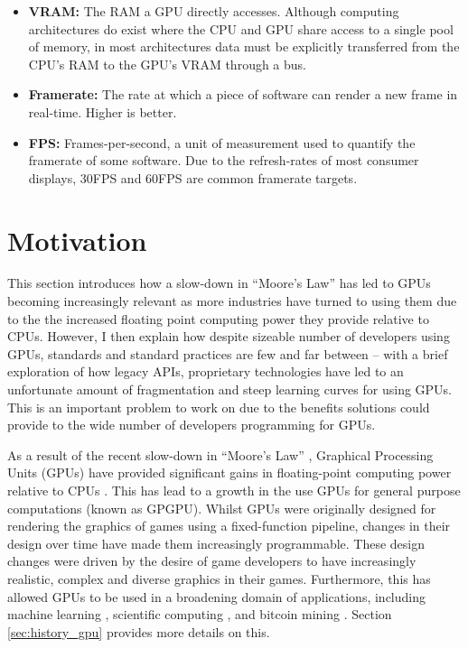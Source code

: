 \documentclass[a4paper,12pt,twoside,openright]{report}
\begin{document}
\begin{itemize}
    \item \textbf{VRAM:} The RAM a GPU directly accesses. Although computing
    architectures do exist where the CPU and GPU share access to a single pool
    of memory, in most architectures data must be explicitly transferred from
    the CPU's RAM to the GPU's VRAM through a bus.

    \item \textbf{Framerate:} The rate at which a piece of software can render
    a new frame in real-time. Higher is better.

    \item \textbf{FPS:} Frames-per-second, a unit of measurement used to
    quantify the framerate of some software. Due to the refresh-rates of most
    consumer displays, 30FPS and 60FPS are common framerate targets.

\end{itemize}

\section{Motivation}

This section introduces how a slow-down in ``Moore's Law'' has led to GPUs
becoming increasingly relevant as more industries have turned to using them due
to the the increased floating point computing power they provide relative to
CPUs. However, I then explain how despite sizeable number of developers using
GPUs, standards and standard practices are few and far between -- with a brief
exploration of how legacy APIs, proprietary technologies have led to an
unfortunate amount of fragmentation and steep learning curves for using GPUs.
This is an important problem to work on due to the benefits solutions could
provide to the wide number of developers programming for GPUs.

As a result of the recent slow-down in ``Moore's Law'' \cite{MooreLawSlowdown},
Graphical Processing Units (GPUs) have provided significant gains in
floating-point computing power relative to CPUs \cite{CPUGPUOverTime}. This has
lead to a growth in the use GPUs for general purpose computations (known as
GPGPU). Whilst GPUs were originally designed for rendering the graphics of
games using a fixed-function pipeline, changes in their design over time have
made them increasingly programmable. These design changes were driven by the
desire of game developers to have increasingly realistic, complex and diverse
graphics in their games. Furthermore, this has allowed GPUs to be used in a
broadening domain of applications, including machine learning \cite{TODO},
scientific computing \cite{TODO}, and bitcoin mining \cite{TODO}. Section
\ref{sec:history_gpu} provides more details on this.
\end{document}
